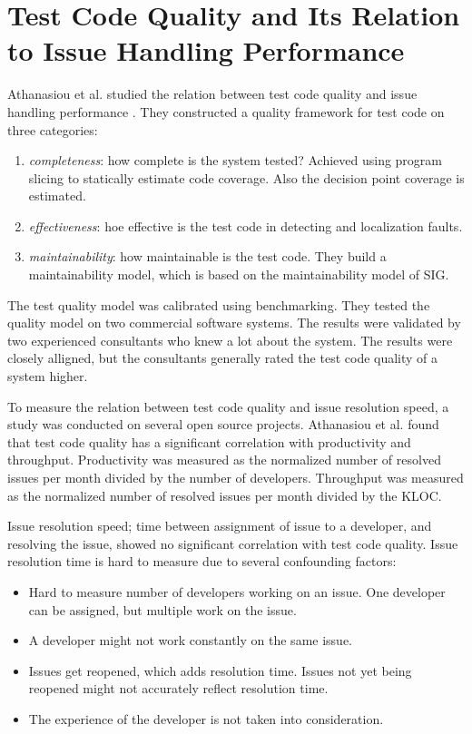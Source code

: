 \documentclass{uvamscse}
\newcommand{\AtestCodeQuality}{Athanasiou et al.}
\begin{document}
\section{Test Code Quality and Its Relation to Issue Handling Performance}

\AtestCodeQuality{} studied the relation between test code quality and issue handling performance \cite{athanasiou2014test}. They constructed a quality framework for test code on three categories:

\begin{enumerate}
	\item \textit{completeness}: how complete is the system tested? Achieved using program slicing to statically estimate code coverage. Also the decision point coverage is estimated.
	\item \textit{effectiveness}: hoe effective is the test code in detecting and localization faults. 
	\item \textit{maintainability}: how maintainable is the test code. They build a  maintainability model, which is based on the maintainability model of SIG. 
\end{enumerate}

The test quality model was calibrated using benchmarking. They tested the quality model on two commercial software systems. The results were validated by two experienced consultants who knew a lot about the system. The results were closely alligned, but the consultants generally rated the test code quality of a system higher.

To measure the relation between test code quality and issue resolution speed, a study was conducted on several open source projects. \AtestCodeQuality{} found that test code quality has a significant correlation with productivity and throughput. Productivity was measured as the normalized number of resolved issues per month divided by the number of developers. Throughput was measured as the normalized number of resolved issues per month divided by the KLOC. 

Issue resolution speed; time between assignment of issue to a developer, and resolving the issue, showed no significant correlation with test code quality. Issue resolution time is hard to measure due to several confounding factors:

\begin{itemize}
	\item Hard to measure number of developers working on an issue. One developer can be assigned, but multiple work on the issue.
	\item A developer might not work constantly on the same issue.
	\item Issues get reopened, which adds resolution time. Issues not yet being reopened might not accurately reflect resolution time.
	\item The experience of the developer is not taken into consideration.
\end{itemize}
\end{document}
